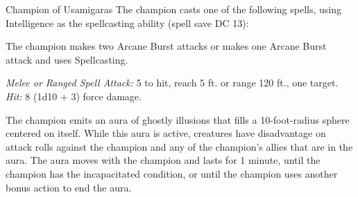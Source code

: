 \documentclass[10pt,a4paper,twoside,bg=print,twocolumn,openany,nodeprecatedcode]{dndbook}
\begin{document}
\begin{DndMonster}[float=t]{Champion of Usamigaras}
\DndMonsterBasics[
armor-class = {12 (15 with \textit{mage armor})},
hit-points = {\DndDice{6d8 + 6}},
speed = {30 ft.}
]
\DndMonsterAbilityScores[
 str = 10,
 dex = 14,
 con = 12,
 int = 17,
 wis = 14,
 cha = 15
]
\DndMonsterDetails[
saving-throws = {Int +5, Cha +4},
skills = {Arcana +5, Deception +6, Sleight Of Hand +4},
languages = {Common},
challenge = 2,
]
The champion casts one of the following spells, using Intelligence as the spellcasting ability (spell save DC 13):
\begin{DndMonsterSpells}
\end{DndMonsterSpells}
The champion makes two Arcane Burst attacks or makes one Arcane Burst attack and uses Spellcasting.

\textsl{Melee or Ranged Spell Attack:} 5 to hit, reach 5 ft. or range 120 ft., one target. \textsl{Hit:} 8 (1d10 + 3) force damage.

The champion emits an aura of ghostly illusions that fills a 10-foot-radius sphere centered on itself. While this aura is active, creatures have disadvantage on attack rolls against the champion and any of the champion's allies that are in the aura. The aura moves with the champion and lasts for 1 minute, until the champion has the incapacitated condition, or until the champion uses another bonus action to end the aura.

\end{DndMonster}
\end{document}
